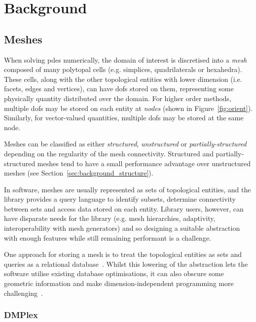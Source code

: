 \section{Background}
\label{sec:background}

\subsection{Meshes}
\label{sec:background_mesh}

When solving \glspl{pde} numerically, the domain of interest is discretised into a \textit{mesh} composed of many polytopal cells (e.g. simplices, quadrilaterals or hexahedra).
These cells, along with the other topological entities with lower dimension (i.e. facets, edges and vertices), can have \glspl{dof} stored on them, representing some physically quantity distributed over the domain.
For higher order methods, multiple \glspl{dof} may be stored on each entity at \textit{nodes} (shown in Figure~\ref{fig:orient}).
Similarly, for vector-valued quantities, multiple \glspl{dof} may be stored at the same node.

Meshes can be classified as either \textit{structured}, \textit{unstructured} or \textit{partially-structured} depending on the regularity of the mesh connectivity.
Structured and partially-structured meshes tend to have a small performance advantage over unstructured meshes (see Section~\ref{sec:background_structure}).

In software, meshes are usually represented as sets of topological entities, and the library provides a query language to identify subsets, determine connectivity between sets and access data stored on each entity.
Library users, however, can have disparate needs for the library (e.g. mesh hierarchies, adaptivity, interoperability with mesh generators) and so designing a suitable abstraction with enough features while still remaining performant is a challenge.

One approach for storing a mesh is to treat the topological entities as sets and queries as a relational database~\cite{tautgesMOABMeshOrientedDatabase2004}.
Whilst this lowering of the abstraction lets the software utilise existing database optimisations, it can also obscure some geometric information and make dimension-independent programming more challenging~\cite{knepleyMeshAlgorithmsPDE2009}.

\subsubsection{DMPlex}
\label{sec:background_mesh_dmplex}

